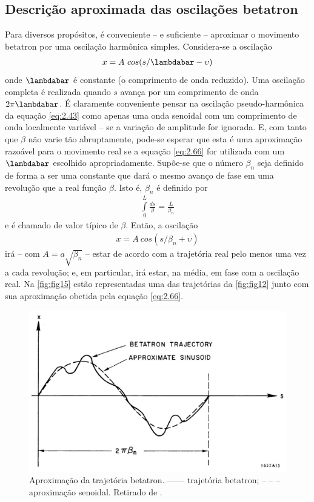 \subsection{Descrição aproximada das oscilações betatron}
Para diversos propósitos, é conveniente -- e suficiente -- aproximar o movimento betatron por uma oscilação harmônica simples. Considera-se a oscilação
\begin{align}
	x = A\ cos(s/ \lambdabar - \upsilon)\label{eq:2.66}
\end{align}
onde $\lambdabar$ é constante (o comprimento de onda reduzido). Uma oscilação completa é realizada quando $s$ avança por um comprimento de onda $2\pi \lambdabar$. É claramente conveniente pensar na oscilação pseudo-harmônica da equação \eqref{eq:2.43} como apenas uma onda senoidal com um comprimento de onda localmente variável -- se a variação de amplitude for ignorada. E, com tanto que $\beta$ não varie tão abruptamente, pode-se esperar que esta é uma aproximação razoável para o movimento real se a equação \eqref{eq:2.66} for utilizada com um $\lambdabar$ escolhido apropriadamente. Supõe-se que o número $\beta_n$ seja definido de forma a ser uma constante que dará o mesmo avanço de fase em uma revolução que a real função $\beta$. Isto é, $\beta_n$ é definido por
\begin{align}
	\int\limits_{0}^{L} \frac{ds}{\beta} = \frac{L}{\beta_n}\label{eq:2.67}
\end{align}
e é chamado de valor típico de $\beta$. Então, a oscilação
\begin{align}
	x = A\ cos(s/\beta_n + \upsilon)\label{eq:2.68}
\end{align}
irá -- com $A=a\sqrt{\beta_n}$ -- estar de acordo com a trajetória real pelo menos uma vez a cada revolução; e, em particular, irá estar, na média, em fase com a oscilação real. Na \autoref{fig:fig15} estão representadas uma das trajetórias da \autoref{fig:fig12} junto com sua aproximação obetida pela equação \eqref{eq:2.66}.

\begin{figure}[!htb]
	\centering
	\includegraphics[width=0.7\linewidth]{./Figuras/fig15.jpeg}
	\caption{Aproximação da trajetória betatron.  ------ trajetória betatron; -- -- --  aproximação senoidal. Retirado de \cite{sands1970physics}.}
	\label{fig:fig15}
\end{figure}

